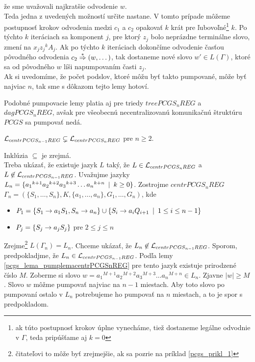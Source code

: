 \begin{dokaz}
  že sme uvažovali najkratšie odvodenie $w$. \\ Teda jedna z
  uvedených možností určite nastane. V tomto prípade môžeme
  postupnosť krokov odvodenia medzi $c_1$ a $c_2$ opakovať $k$ krát
  pre ľubovoľné\footnote{ak túto postupnosť krokov úplne vynecháme,
  tiež dostaneme legálne odvodnie v $\Gamma$, teda pripúšťame aj
  $k=0$ } $k$. Po týchto $k$ iteráciach sa komponent $j$, pre ktorý
  $z_j$ bolo neprázdne terminálne slovo, zmení na $x_j{z_j}^kA_j$.
  Ak po týchto $k$ ite\-rá\-ciach dokončíme odvodenie časťou pôvodného
  odvodenia $c_2\overset{*}{\Rightarrow} (w,\dots )$, tak dostaneme nové slovo
  $w'\in L(\Gamma)$, ktoré sa od pôvodného $w$ líši napumpovaním
  časti $z_j$. \\ Ak si uvedomíme, že počet podslov, ktoré môžu byť
  takto pumpované, môže byť najviac $n$, tak sme s dôkazom tejto
  lemy hotoví.
\end{dokaz}

\smallskip

Podobné pumpovacie lemy platia aj pre triedy $treePCGS_nREG$
a $dagPCGS_nREG$, avšak pre všeobecnú necentralizovanú
komunikačnú štruktúru $PCGS$ sa pumpovať nedá.

\begin{veta}
  $\mathcal{L}_{centrPCGS_{n-1} REG} \subsetneq
    \mathcal{L}_{centrPCGS_n REG}$
  pre $n\geq 2$.
\end{veta}

\begin{dokaz}
  Inklúzia $\subseteq$ je zrejmá.
  \\ Treba ukázať, že existuje jazyk
  $L$ taký, že $L \in \mathcal{L}_{centrPCGS_n REG}$ a\newline
  $L \not \in \mathcal{L}_{centrPCGS_{n-1}REG}$. Uvažujme jazyky $L_n=\{
  {a_1}^{k+1}{a_2}^{k+2}{a_3}^{k+3}\dots {a_n}^{k+n}\enspace |\enspace k\geq 0\}$.
  Zostrojme $centrPCGS_nREG$ $\Gamma_n=(\{S_1,\dots
  ,S_n\},K,\{a_1,\dots ,a_n\},G_1,\dots ,G_n)$, kde
  \begin{itemize}
    \item $P_1=\{S_1\rightarrow a_1S_1,S_n\rightarrow a_n\}\cup\{ S_i\rightarrow a_iQ_{i+1}\enspace |\enspace 1\leq
    i\leq n-1\}$
    \item $P_j=\{S_j\rightarrow a_jS_j\}$ pre $2\leq j\leq n$
  \end{itemize}
  Zrejme\footnote{čitateľovi
   to môže byť zrejmejšie, ak sa pozrie na príklad \ref{pcgs_prikl_1}}
  $L(\Gamma_n)=L_n$. Chceme ukázať, že
  $L_n\not\in\mathcal{L}_{centrPCGS_{n-1}REG}$. Sporom,
  predpokladjme, že $L_n\in\mathcal{L}_{centrPCGS_{n-1}REG}$. Podľa
  lemy \ref{pcgs_lema_pumplemacentrPCGSnREG} pre tento jazyk existuje
  prirodzené číslo $M$. Zoberme si slovo
  $w={a_1}^{M+1}{a_2}^{M+2}{a_3}^{M+3}\dots {a_n}^{M+n}\in L_n$.
  Zjavne $|w|\geq M$. Slovo $w$ môžme pumpovať najviac na $n-1$
  miestach. Aby toto slovo po pumpovaní ostalo v $L_n$ potrebujeme
  ho pumpovať na $n$ miestach, a to je spor s predpokladom.
\end{dokaz}

